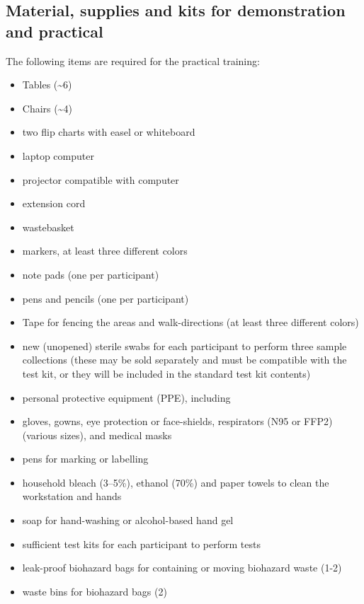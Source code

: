 \documentclass[
]{book}
\providecommand{\tightlist}{%
  \setlength{\itemsep}{0pt}\setlength{\parskip}{0pt}}
\begin{document}
\hypertarget{material-supplies-and-kits-for-demonstration-and-practical}{%
\subsection{Material, supplies and kits for demonstration and practical}\label{material-supplies-and-kits-for-demonstration-and-practical}}

The following items are required for the practical training:

\begin{itemize}
\tightlist
\item
  Tables (\textasciitilde6)
\item
  Chairs (\textasciitilde4)
\item
  two flip charts with easel or whiteboard
\item
  laptop computer
\item
  projector compatible with computer
\item
  extension cord
\item
  wastebasket
\item
  markers, at least three different colors
\item
  note pads (one per participant)
\item
  pens and pencils (one per participant)
\item
  Tape for fencing the areas and walk-directions (at least three different
  colors)
\item
  new (unopened) sterile swabs for each participant to perform three
  sample collections (these may be sold separately and must be compatible
  with the test kit, or they will be included in the standard test kit
  contents)
\item
  personal protective equipment (PPE), including
\item
  gloves, gowns, eye protection or face-shields, respirators (N95 or FFP2) (various sizes), and medical masks
\item
  pens for marking or labelling
\item
  household bleach (3--5\%), ethanol (70\%) and paper towels to clean the
  workstation and hands
\item
  soap for hand-washing or alcohol-based hand gel
\item
  sufficient test kits for each participant to perform tests
\item
  leak-proof biohazard bags for containing or moving biohazard waste (1-2)
\item
  waste bins for biohazard bags (2)

\end{itemize}
\end{document}
